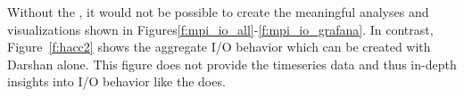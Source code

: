 Without the \connector{}, it would not be possible to create the meaningful analyses and visualizations shown in Figures\ref{f:mpi_io_all}-\ref{f:mpi_io_grafana}. In contrast, Figure~\ref{f:hacc2} shows the aggregate I/O behavior which can be created with Darshan alone. This figure does not provide the timeseries data and thus in-depth insights into I/O behavior like the \Darshan{} does.


